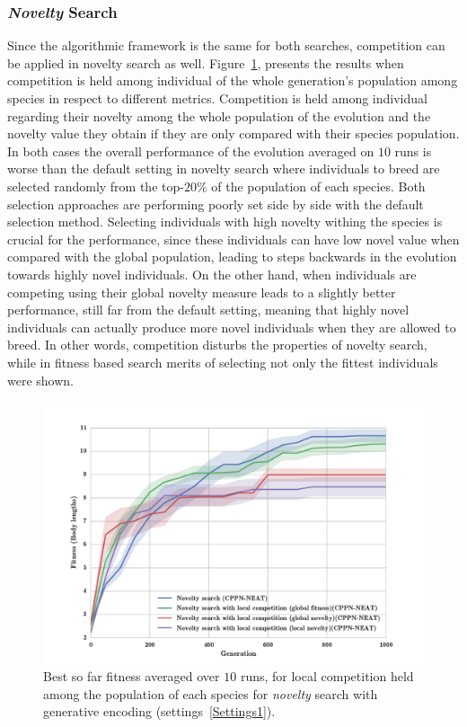 \subsubsection*{\emph{Novelty} Search}

Since the algorithmic framework is the same for both searches, competition can be applied in novelty search as well. Figure~\ref{fig:NoveltyCompetitionsSize5}, presents the results when competition is held among individual of the whole generation's population among species in respect to different metrics. Competition is held among individual regarding their novelty among the whole population of the evolution and the novelty value they obtain if they are only compared with their species population. In both cases the overall performance of the evolution averaged on $10$ runs is worse than the default setting in novelty search where individuals to breed are selected randomly from the top-$20\%$ of the population of each species. Both selection approaches are performing poorly set side by side with the default selection method. Selecting individuals with high novelty withing the species is crucial for the performance, since these individuals can have low novel value when compared with the global population, leading to steps backwards in the evolution towards highly novel individuals. On the other hand, when individuals are competing using their global novelty measure leads to a slightly better performance, still far from the default setting, meaning that highly novel individuals can actually produce more novel individuals when they are allowed to breed. In other words, competition disturbs  the properties of novelty search, while in fitness based search merits of selecting not only the fittest individuals were shown.


\begin{figure}[t!]
\centering
\includegraphics[width=1.0\textwidth]{../Figures/Results/NoveltyCompetitionsSize5.pdf}
\caption{Best so far fitness averaged over $10$ runs, for local competition held among the population of each species for \emph{novelty} search with generative encoding (settings~\ref{Settings1}).}
\label{fig:NoveltyCompetitionsSize5}
\end{figure}



